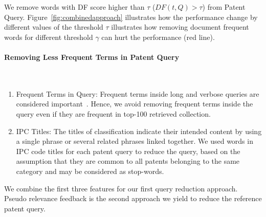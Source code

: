 We remove words with DF score higher than $\tau$ ($DF(t, Q)>\tau$) from Patent Query. Figure~\ref{fig:combinedapproach} illustrates how the performance change by different values of the threshold $\tau$ illustrates how removing document frequent words for different threshold $\gamma$ can hurt the performance (red line). 
\paragraph{Removing Less Frequent Terms in Patent Query}
\ \\
\begin{enumerate}
\item Frequent Terms in Query: Frequent terms inside long and verbose queries are considered important~\citep{maxwell2013compact}. Hence, we avoid removing frequent terms inside the query even if they are frequent in top-100 retrieved collection.
\item IPC Titles: The titles of classification indicate their intended content by using a single phrase or several related phrases linked together. We used words in IPC code titles for each patent query to reduce the query, based on the assumption that they are common to all patents belonging to the same category and may be considered as stop-words.
\end{enumerate}
We combine the first three features for our first query reduction approach. Pseudo relevance feedback is the second approach we yield to reduce the reference patent query. 
